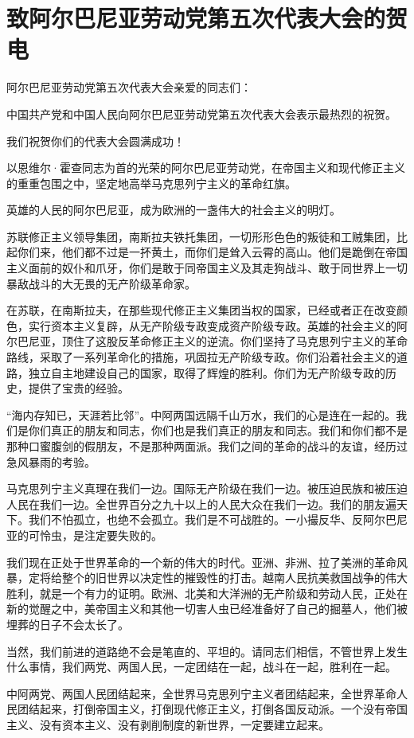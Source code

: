 \section[致阿尔巴尼亚劳动党第五次代表大会的贺电（一九六六年十月二十五日）]{致阿尔巴尼亚劳动党第五次代表大会的贺电}


阿尔巴尼亚劳动党第五次代表大会亲爱的同志们：

中国共产党和中国人民向阿尔巴尼亚劳动党第五次代表大会表示最热烈的祝贺。

我们祝贺你们的代表大会圆满成功！

以恩维尔·霍查同志为首的光荣的阿尔巴尼亚劳动党，在帝国主义和现代修正主义的重重包围之中，坚定地高举马克思列宁主义的革命红旗。

英雄的人民的阿尔巴尼亚，成为欧洲的一盏伟大的社会主义的明灯。

苏联修正主义领导集团，南斯拉夫铁托集团，一切形形色色的叛徒和工贼集团，比起你们来，他们都不过是一抔黄土，而你们是耸入云霄的高山。他们是跪倒在帝国主义面前的奴仆和爪牙，你们是敢于同帝国主义及其走狗战斗、敢于同世界上一切暴敌战斗的大无畏的无产阶级革命家。

在苏联，在南斯拉夫，在那些现代修正主义集团当权的国家，已经或者正在改变颜色，实行资本主义复辟，从无产阶级专政变成资产阶级专政。英雄的社会主义的阿尔巴尼亚，顶住了这股反革命修正主义的逆流。你们坚持了马克思列宁主义的革命路线，采取了一系列革命化的措施，巩固拉无产阶级专政。你们沿着社会主义的道路，独立自主地建设自己的国家，取得了辉煌的胜利。你们为无产阶级专政的历史，提供了宝贵的经验。

“海内存知已，天涯若比邻”。中阿两国远隔千山万水，我们的心是连在一起的。我们是你们真正的朋友和同志，你们也是我们真正的朋友和同志。我们和你们都不是那种口蜜腹剑的假朋友，不是那种两面派。我们之间的革命的战斗的友谊，经历过急风暴雨的考验。

马克思列宁主义真理在我们一边。国际无产阶级在我们一边。被压迫民族和被压迫人民在我们一边。全世界百分之九十以上的人民大众在我们一边。我们的朋友遍天下。我们不怕孤立，也绝不会孤立。我们是不可战胜的。一小撮反华、反阿尔巴尼亚的可怜虫，是注定要失败的。

我们现在正处于世界革命的一个新的伟大的时代。亚洲、非洲、拉了美洲的革命风暴，定将给整个的旧世界以决定性的摧毁性的打击。越南人民抗美救国战争的伟大胜利，就是一个有力的证明。欧洲、北美和大洋洲的无产阶级和劳动人民，正处在新的觉醒之中，美帝国主义和其他一切害人虫已经准备好了自己的掘墓人，他们被埋葬的日子不会太长了。

当然，我们前进的道路绝不会是笔直的、平坦的。请同志们相信，不管世界上发生什么事情，我们两党、两国人民，一定团结在一起，战斗在一起，胜利在一起。

中阿两党、两国人民团结起来，全世界马克思列宁主义者团结起来，全世界革命人民团结起来，打倒帝国主义，打倒现代修正主义，打倒各国反动派。一个没有帝国主义、没有资本主义、没有剥削制度的新世界，一定要建立起来。



